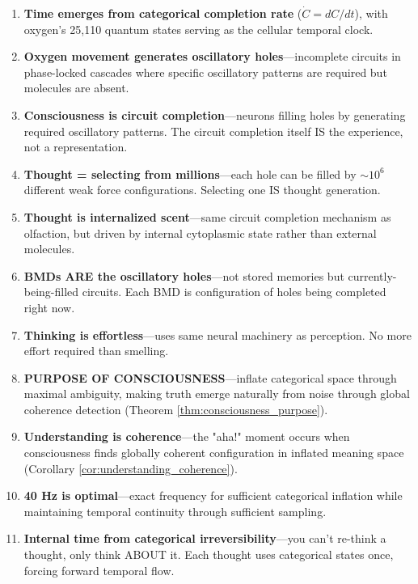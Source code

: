 \documentclass[11pt,a4paper]{article}
\begin{document}
\begin{enumerate}
\item \textbf{Time emerges from categorical completion rate} ($\dot{C} = dC/dt$), with oxygen's 25,110 quantum states serving as the cellular temporal clock.

\item \textbf{Oxygen movement generates oscillatory holes}—incomplete circuits in phase-locked cascades where specific oscillatory patterns are required but molecules are absent.

\item \textbf{Consciousness is circuit completion}—neurons filling holes by generating required oscillatory patterns. The circuit completion itself IS the experience, not a representation.

\item \textbf{Thought = selecting from millions}—each hole can be filled by $\sim 10^6$ different weak force configurations. Selecting one IS thought generation.

\item \textbf{Thought is internalized scent}—same circuit completion mechanism as olfaction, but driven by internal cytoplasmic state rather than external molecules.

\item \textbf{BMDs ARE the oscillatory holes}—not stored memories but currently-being-filled circuits. Each BMD is configuration of holes being completed right now.

\item \textbf{Thinking is effortless}—uses same neural machinery as perception. No more effort required than smelling.

\item \textbf{PURPOSE OF CONSCIOUSNESS}—inflate categorical space through maximal ambiguity, making truth emerge naturally from noise through global coherence detection (Theorem \ref{thm:consciousness_purpose}).

\item \textbf{Understanding is coherence}—the "aha!" moment occurs when consciousness finds globally coherent configuration in inflated meaning space (Corollary \ref{cor:understanding_coherence}).

\item \textbf{40 Hz is optimal}—exact frequency for sufficient categorical inflation while maintaining temporal continuity through sufficient sampling.

\item \textbf{Internal time from categorical irreversibility}—you can't re-think a thought, only think ABOUT it. Each thought uses categorical states once, forcing forward temporal flow.


\end{enumerate}
\end{document}
